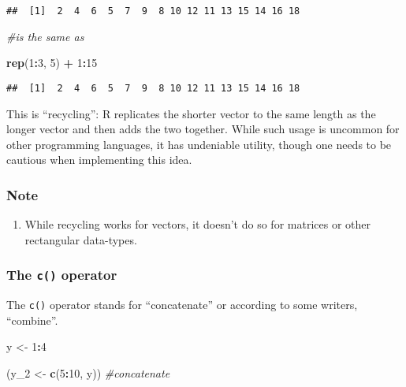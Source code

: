 \documentclass[11pt,]{article}
\newenvironment{Shaded}{\begin{snugshade}}{\end{snugshade}}
\newcommand{\KeywordTok}[1]{\textcolor[rgb]{0.13,0.29,0.53}{\textbf{#1}}}
\newcommand{\DecValTok}[1]{\textcolor[rgb]{0.00,0.00,0.81}{#1}}
\newcommand{\StringTok}[1]{\textcolor[rgb]{0.31,0.60,0.02}{#1}}
\newcommand{\CommentTok}[1]{\textcolor[rgb]{0.56,0.35,0.01}{\textit{#1}}}
\newcommand{\OperatorTok}[1]{\textcolor[rgb]{0.81,0.36,0.00}{\textbf{#1}}}
\newcommand{\NormalTok}[1]{#1}
\providecommand{\tightlist}{%
  \setlength{\itemsep}{0pt}\setlength{\parskip}{0pt}}
\begin{document}
\begin{verbatim}
##  [1]  2  4  6  5  7  9  8 10 12 11 13 15 14 16 18
\end{verbatim}

\begin{Shaded}
\begin{Highlighting}[]
\CommentTok{#is the same as}

\KeywordTok{rep}\NormalTok{(}\DecValTok{1}\OperatorTok{:}\DecValTok{3}\NormalTok{, }\DecValTok{5}\NormalTok{) }\OperatorTok{+}\StringTok{ }\DecValTok{1}\OperatorTok{:}\DecValTok{15}
\end{Highlighting}
\end{Shaded}

\begin{verbatim}
##  [1]  2  4  6  5  7  9  8 10 12 11 13 15 14 16 18
\end{verbatim}

This is ``recycling'': R replicates the shorter vector to the same
length as the longer vector and then adds the two together. While such
usage is uncommon for other programming languages, it has undeniable
utility, though one needs to be cautious when implementing this idea.

\subsubsection{Note}\label{note}

\begin{enumerate}
\def\labelenumi{\arabic{enumi}.}
\tightlist
\item
  While recycling works for vectors, it doesn't do so for matrices or
  other rectangular data-types.
\end{enumerate}

\subsubsection{\texorpdfstring{The \texttt{c()}
operator}{The c() operator}}\label{the-c-operator}

The \texttt{c()} operator stands for ``concatenate'' or according to
some writers, ``combine''.

\begin{Shaded}
\begin{Highlighting}[]
\NormalTok{y <-}\StringTok{ }\DecValTok{1}\OperatorTok{:}\DecValTok{4}

\NormalTok{(y_}\DecValTok{2}\NormalTok{ <-}\StringTok{ }\KeywordTok{c}\NormalTok{(}\DecValTok{5}\OperatorTok{:}\DecValTok{10}\NormalTok{, y)) }\CommentTok{#concatenate}
\end{Highlighting}
\end{Shaded}
\end{document}
